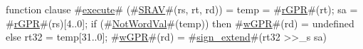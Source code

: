 function clause #\hyperref[zexecute]{execute}# (#\hyperref[zSRAV]{SRAV}#(rs, rt, rd)) =
  {
    temp = #\hyperref[zrGPR]{rGPR}#(rt);
    sa   = #\hyperref[zrGPR]{rGPR}#(rs)[4..0];
    if (#\hyperref[zNotWordVal]{NotWordVal}#(temp)) then
      #\hyperref[zwGPR]{wGPR}#(rd) = undefined
    else {
      rt32 = temp[31..0];
      #\hyperref[zwGPR]{wGPR}#(rd) = #\hyperref[zsignzyextend]{sign\_extend}#(rt32 >>_s sa)
    }
  }
